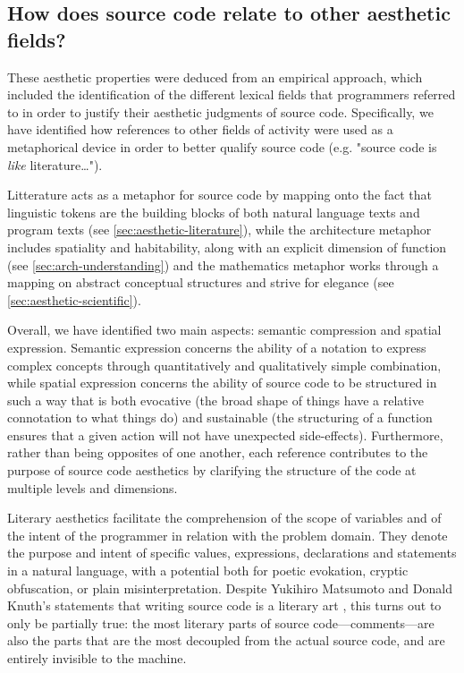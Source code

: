 \subsection{How does source code relate to other aesthetic fields?}
\label{subsec:conclusion-rq-2}

These aesthetic properties were deduced from an empirical approach, which included the identification of the different lexical fields that programmers referred to in order to justify their aesthetic judgments of source code. Specifically, we have identified how references to other fields of activity were used as a metaphorical device in order to better qualify source code (e.g. "source code is \emph{like} literature\dots").

Litterature acts as a metaphor for source code by mapping onto the fact that linguistic tokens are the building blocks of both natural language texts and program texts (see \ref{sec:aesthetic-literature}), while the architecture metaphor includes spatiality and habitability, along with an explicit dimension of function (see \ref{sec:arch-understanding}) and the mathematics metaphor works through a mapping on abstract conceptual structures and strive for elegance (see \ref{sec:aesthetic-scientific}).

Overall, we have identified two main aspects: semantic compression and spatial expression. Semantic expression concerns the ability of a notation to express complex concepts through quantitatively and qualitatively simple combination, while spatial expression concerns the ability of source code to be structured in such a way that is both evocative (the broad shape of things have a relative connotation to what things do) and sustainable (the structuring of a function ensures that a given action will not have unexpected side-effects). Furthermore, rather than being opposites of one another, each reference contributes to the purpose of source code aesthetics by clarifying the structure of the code at multiple levels and dimensions.

Literary aesthetics facilitate the comprehension of the scope of variables and of the intent of the programmer in relation with the problem domain. They denote the purpose and intent of specific values, expressions, declarations and statements in a natural language, with a potential both for poetic evokation, cryptic obfuscation, or plain misinterpretation. Despite Yukihiro Matsumoto and Donald Knuth's statements that writing source code is a literary art \citep{knuth_literate_1984,matsumoto_treating_2007}, this turns out to only be partially true: the most literary parts of source code—comments—are also the parts that are the most decoupled from the actual source code, and are entirely invisible to the machine.


